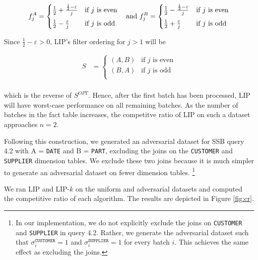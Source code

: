 \begin{equation*}
f_j^A = 
    \begin{cases}
    \frac{1}{2} + \frac{\frac{1}{2}-\varepsilon}{j} & \text{if $j$ is even} \\[0.5em]
    \frac{1}{2} - \frac{\varepsilon}{j} &  \text{if $j$ is odd} \\
    \end{cases}  \quad \text{and }
f_j^B = 
    \begin{cases}
    \frac{1}{2} - \frac{\frac{1}{2}-\varepsilon}{j} & \text{if $j$ is even} \\[0.5em]
    \frac{1}{2} + \frac{\varepsilon}{j} &  \text{if $j$ is odd} \\
    \end{cases}\\[0.5em]
\end{equation*}

Since $\frac{1}{2} - \varepsilon > 0$, LIP's filter ordering for $j > 1$ will be

\begin{align*}
S &= 
    \begin{cases}
    (A, B) & \text{if $j$ is even} \\[0.5em]
    (B, A) & \text{if $j$ is odd} \\
    \end{cases}\\[0.5em]
\end{align*}

which is the reverse of $S^{OPT}$. 
Hence, after the first batch has been processed, LIP will have worst-case performance on all remaining batches. 
As the number of batches in the fact table increases, the competitve ratio of LIP on such a dataset approaches $n =2$.

Following this construction, we generated an adversarial dataset for SSB query 4.2 with A = \texttt{DATE} and B = \texttt{PART},
excluding the joins on the \texttt{CUSTOMER} and \texttt{SUPPLIER} dimension tables.
We exclude these two joins because it is much simpler to generate an adversarial dataset on fewer dimension tables.
\footnote{In our implementation, we do not explicitly exclude the joins on \texttt{CUSTOMER} and \texttt{SUPPLIER} in query 4.2. 
Rather, we generate the adversarial dataset such that $\sigma_i^{\texttt{CUSTOMER}}=1$ and $\sigma_i^{\texttt{SUPPLIER}}=1$ for every batch $i$.
This achieves the same effect as excluding the joins.}

We ran LIP and LIP-$k$ on the uniform and adversarial datasets and computed the competitive ratio of each algorithm.
The results are depicted in Figure \ref{fig:cr}. 

